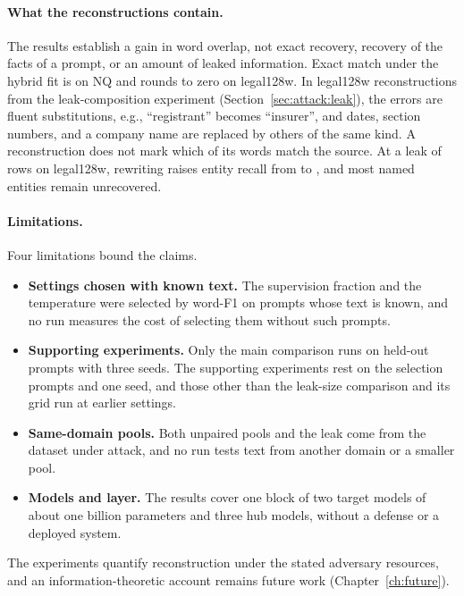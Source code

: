 \paragraph{What the reconstructions contain.} The results establish a gain in word overlap, not exact recovery, recovery of the facts of a prompt, or an amount of leaked information.
Exact match under the hybrid fit is  on NQ and rounds to zero on legal128w.
In legal128w reconstructions from the leak-composition experiment (Section~\ref{sec:attack:leak}), the errors are fluent substitutions, e.g., ``registrant'' becomes ``insurer'', and dates, section numbers, and a company name are replaced by others of the same kind. %
A reconstruction does not mark which of its words match the source.
At a leak of  rows on legal128w, rewriting raises entity recall from  to , and most named entities remain unrecovered.

\paragraph{Limitations.} Four limitations bound the claims.
\begin{itemize}
\item \textbf{Settings chosen with known text.} The supervision fraction and the temperature were selected by word-F1 on  prompts whose text is known, and no run measures the cost of selecting them without such prompts.
\item \textbf{Supporting experiments.} Only the main comparison runs on held-out prompts with three seeds.
The supporting experiments rest on the  selection prompts and one seed, and those other than the leak-size comparison and its grid run at earlier settings.
\item \textbf{Same-domain pools.} Both unpaired pools and the leak come from the dataset under attack, and no run tests text from another domain or a smaller pool.
\item \textbf{Models and layer.} The results cover one block of two target models of about one billion parameters and three hub models, without a defense or a deployed system.
\end{itemize}

The experiments quantify reconstruction under the stated adversary resources, and an information-theoretic account remains future work (Chapter~\ref{ch:future}).
